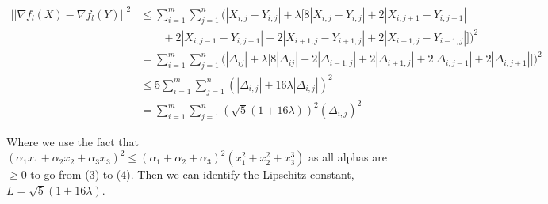 \documentclass{article}
\begin{document}
\begin{align}
||\nabla f_l(X) - \nabla f_l(Y)||^2  & \leq \sum_{i=1}^{m}\sum_{j=1}^{n}\Big(|X_{i,j} - Y_{i,j}| + \lambda\Big[8|X_{i,j}
                      -Y_{i,j}| + 2|X_{i,j+1} - Y_{i,j+1}| \\
                   & \quad \quad + 2|X_{i,j-1} - Y_{i,j-1}| + 
                     2|X_{i+1,j} - Y_{i+1,j}| + 2|X_{i-1,j} - Y_{i-1,j}|\Big]\Big)^2 \\
                   & = \sum_{i=1}^{m}\sum_{j=1}^{n}\Big(|\Delta_{ij}| + \lambda\Big[8|\Delta_{ij}|
                       + 2|\Delta_{i-1,j}| + 2|\Delta_{i+1,j}|
                       + 2|\Delta_{i,j-1}| + 2|\Delta_{i,j+1}|\Big]\Big)^2 \\
                   & \leq 5\sum_{i=1}^{m}\sum_{j=1}^{n}(|\Delta_{i,j}| + 16\lambda|\Delta_{i,j}|)
                       ^2 \\
                   & = \sum_{i=1}^{m}\sum_{j=1}^{n}(\sqrt{5}(1+16\lambda))^2(\Delta_{i,j})^2
\end{align}

\noindent Where we use the fact that $(\alpha_1x_1 + \alpha_2x_2 + \alpha_3x_3)^2 \leq (\alpha_1
+ \alpha_2 + \alpha_3)^2(x_1^2+x_2^2+x_3^3)$ as all alphas are $\geq 0$ to go from
(3) to (4). Then we can identify the Lipschitz constant, $L = \sqrt{5}(1+16\lambda)$. 
\end{document}
